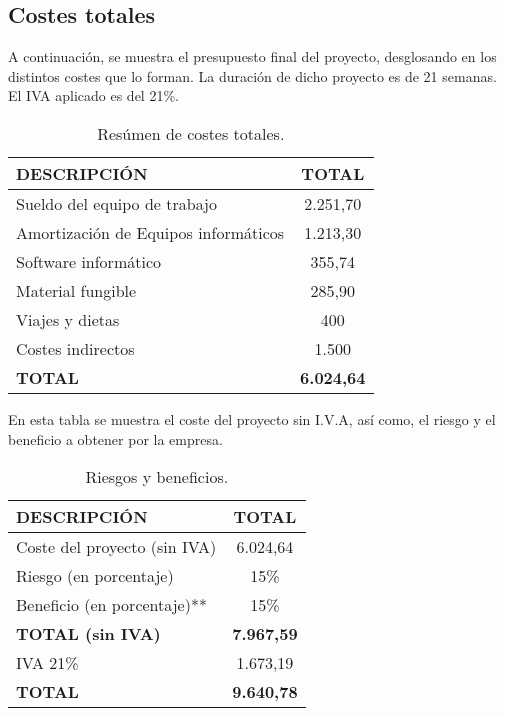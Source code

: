 \newpage
\subsection{Costes totales}
\par A continuación, se muestra el presupuesto final del proyecto, desglosando en los distintos costes que lo forman. La duración de dicho proyecto es de 21 semanas. El IVA aplicado es del 21\%.

\begin{table}[H]
\begin{center}
\begin{tabular}{l c}
\textbf{DESCRIPCIÓN} & \textbf{TOTAL}\\ \hline \hline
Sueldo del equipo de trabajo & 2.251,70\\
Amortización de Equipos informáticos & 1.213,30\\
Software informático & 355,74\\
Material fungible & 285,90\\
Viajes y dietas & 400\\
Costes indirectos & 1.500\\ \hline \hline
\textbf{TOTAL} & \textbf{6.024,64}\\ \hline
\end{tabular}
\caption{Resúmen de costes totales.}
\label{tab:resumenTotal}
\end{center}
\end{table}

En esta tabla se muestra el coste del proyecto sin I.V.A, así como, el riesgo y el beneficio a obtener por la empresa.
\begin{table}[H]
\begin{center}
\begin{tabular}{l c}
\textbf{DESCRIPCIÓN} & \textbf{TOTAL}\\ \hline \hline
Coste del proyecto (sin IVA) &  6.024,64\\
Riesgo (en porcentaje) & 15\% \\
Beneficio (en porcentaje)** & 15\% \\ \hline \hline
\textbf{TOTAL (sin IVA)} & \textbf{7.967,59}\\ \hline \hline
IVA 21\% & 1.673,19 \\\hline \hline
\textbf{TOTAL} &  \textbf{9.640,78}\\ \hline
\end{tabular}
\caption{Riesgos y beneficios.}
\label{tab:total}
\end{center}
\end{table}

